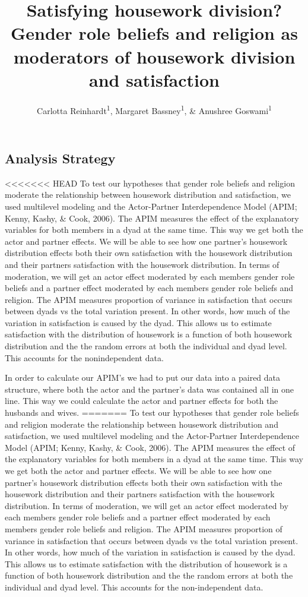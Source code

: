 \documentclass[
  man,floatsintext]{apa6}
\title{Satisfying housework division? Gender role beliefs and religion as moderators of housework division and satisfaction}
\author{Carlotta Reinhardt\textsuperscript{1}, Margaret Bassney\textsuperscript{1}, \& Anushree Goswami\textsuperscript{1}}
\date{}
\affiliation{\vspace{0.5cm}\textsuperscript{1} Smith College}
\begin{document}
\maketitle

\hypertarget{analysis-strategy}{%
\subsection{Analysis Strategy}\label{analysis-strategy}}

<<<<<<< HEAD
To test our hypotheses that gender role beliefs and religion moderate the relationship between housework distribution and satisfaction, we used multilevel modeling and the Actor-Partner Interdependence Model (APIM; Kenny, Kashy, \& Cook, 2006). The APIM measures the effect of the explanatory variables for both members in a dyad at the same time. This way we get both the actor and partner effects. We will be able to see how one partner's housework distribution effects both their own satisfaction with the housework distribution and their partners satisfaction with the housework distribution. In terms of moderation, we will get an actor effect moderated by each members gender role beliefs and a partner effect moderated by each members gender role beliefs and religion. The APIM measures proportion of variance in satisfaction that occurs between dyads vs the total variation present. In other words, how much of the variation in satisfaction is caused by the dyad. This allows us to estimate satisfaction with the distribution of housework is a function of both housework distribution and the the random errors at both the individual and dyad level. This accounts for the nonindependent data.

In order to calculate our APIM's we had to put our data into a paired data structure, where both the actor and the partner's data was contained all in one line. This way we could calculate the actor and partner effects for both the husbands and wives.
=======
To test our hypotheses that gender role beliefs and religion moderate the relationship between housework distribution and satisfaction, we used multilevel modeling and the Actor-Partner Interdependence Model (APIM; Kenny, Kashy, \& Cook, 2006). The APIM measures the effect of the explanatory variables for both members in a dyad at the same time. This way we get both the actor and partner effects. We will be able to see how one partner's housework distribution effects both their own satisfaction with the housework distribution and their partners satisfaction with the housework distribution. In terms of moderation, we will get an actor effect moderated by each members gender role beliefs and a partner effect moderated by each members gender role beliefs and religion. The APIM measures proportion of variance in satisfaction that occurs between dyads vs the total variation present. In other words, how much of the variation in satisfaction is caused by the dyad. This allows us to estimate satisfaction with the distribution of housework is a function of both housework distribution and the the random errors at both the individual and dyad level. This accounts for the non-independent data.
\end{document}
